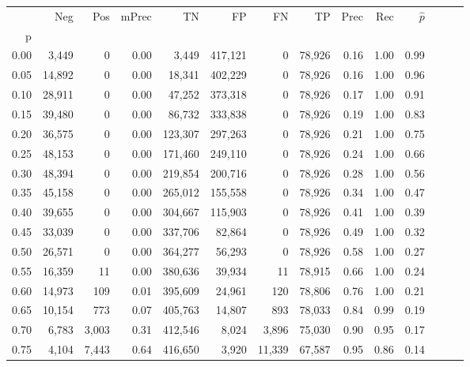 \begin{tabular}{rrrrrrrrrrrrrr}
\toprule
{} &     Neg &     Pos & mPrec &       TN &       FP &      FN &      TP &  Prec &   Rec & $\hat{p}$ \\
p    &         &         &       &          &          &         &         &       &       &           \\
\midrule
0.00 &   3,449 &       0 &  0.00 &    3,449 &  417,121 &       0 &  78,926 &  0.16 &  1.00 &      0.99 \\
0.05 &  14,892 &       0 &  0.00 &   18,341 &  402,229 &       0 &  78,926 &  0.16 &  1.00 &      0.96 \\
0.10 &  28,911 &       0 &  0.00 &   47,252 &  373,318 &       0 &  78,926 &  0.17 &  1.00 &      0.91 \\
0.15 &  39,480 &       0 &  0.00 &   86,732 &  333,838 &       0 &  78,926 &  0.19 &  1.00 &      0.83 \\
0.20 &  36,575 &       0 &  0.00 &  123,307 &  297,263 &       0 &  78,926 &  0.21 &  1.00 &      0.75 \\
0.25 &  48,153 &       0 &  0.00 &  171,460 &  249,110 &       0 &  78,926 &  0.24 &  1.00 &      0.66 \\
0.30 &  48,394 &       0 &  0.00 &  219,854 &  200,716 &       0 &  78,926 &  0.28 &  1.00 &      0.56 \\
0.35 &  45,158 &       0 &  0.00 &  265,012 &  155,558 &       0 &  78,926 &  0.34 &  1.00 &      0.47 \\
0.40 &  39,655 &       0 &  0.00 &  304,667 &  115,903 &       0 &  78,926 &  0.41 &  1.00 &      0.39 \\
0.45 &  33,039 &       0 &  0.00 &  337,706 &   82,864 &       0 &  78,926 &  0.49 &  1.00 &      0.32 \\
0.50 &  26,571 &       0 &  0.00 &  364,277 &   56,293 &       0 &  78,926 &  0.58 &  1.00 &      0.27 \\
0.55 &  16,359 &      11 &  0.00 &  380,636 &   39,934 &      11 &  78,915 &  0.66 &  1.00 &      0.24 \\
0.60 &  14,973 &     109 &  0.01 &  395,609 &   24,961 &     120 &  78,806 &  0.76 &  1.00 &      0.21 \\
0.65 &  10,154 &     773 &  0.07 &  405,763 &   14,807 &     893 &  78,033 &  0.84 &  0.99 &      0.19 \\
0.70 &   6,783 &   3,003 &  0.31 &  412,546 &    8,024 &   3,896 &  75,030 &  0.90 &  0.95 &      0.17 \\
0.75 &   4,104 &   7,443 &  0.64 &  416,650 &    3,920 &  11,339 &  67,587 &  0.95 &  0.86 &      0.14 \\

\end{tabular}
